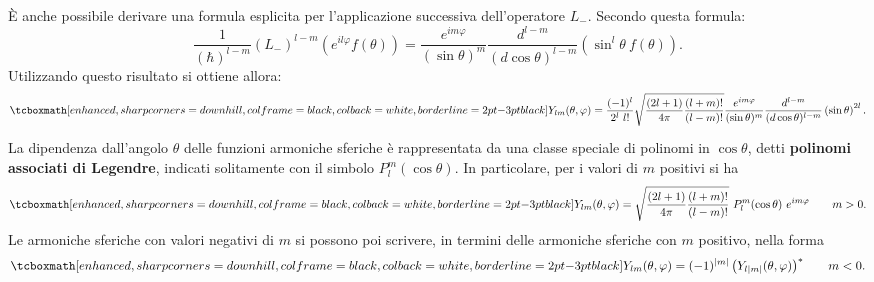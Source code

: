 È anche possibile derivare una formula esplicita per l'applicazione successiva dell'operatore $L_-$. Secondo questa formula:
	\begin{equation}
		\frac{1}{(\hbar) ^{l-m}}(L_-)^{l-m} \left( e^{il\varphi} f(\theta) \right) = \frac{e^{im\varphi}}{(\sin \theta ) ^m} \frac{d^{l-m}}{(d\cos \theta )^{l-m}}\left( \sin ^l \theta \ f(\theta ) \right).
	\end{equation}
Utilizzando questo risultato si ottiene allora:
	\begin{align}
		\tcboxmath[enhanced, sharp corners=downhill, colframe=black, colback=white, borderline={2pt}{-3pt}{black}]{
			Y_{lm} (\theta ,  \varphi ) = \frac{(-1)^{l}}{2^l\ l!}\sqrt{\frac{(2l+1)}{4\pi}\frac{(l+m)!}{(l-m)!}}  \frac{e^{im\varphi}}{(\sin \theta ) ^m} \frac{d^{l-m}}{(d\cos \theta )^{l-m}}\left( \sin  \theta \right) ^{2l}.
			}\nonumber \\[0.1cm] 
	\end{align}
La dipendenza dall'angolo $\theta$ delle funzioni armoniche sferiche è rappresentata da una classe speciale di polinomi in $\cos \theta$, detti \textbf{polinomi associati di Legendre}, indicati solitamente con il simbolo $P_l ^m (\cos \theta)$. In particolare, per i valori di $m$ positivi si ha 
	\begin{equation}
		\tcboxmath[enhanced, sharp corners=downhill, colframe=black, colback=white, borderline={2pt}{-3pt}{black}]{
			Y_{lm} (\theta ,  \varphi ) = \sqrt{\frac{(2l+1)}{4\pi}\frac{(l+m)!}{(l-m)!}}\ P_l ^m (\cos \theta)\ e^{im\varphi}
			}\qquad m>0.
	\end{equation}
Le armoniche sferiche con valori negativi di $m$ si possono poi scrivere, in termini delle armoniche sferiche con $m$ positivo, nella forma
	\begin{equation}
		\tcboxmath[enhanced, sharp corners=downhill, colframe=black, colback=white, borderline={2pt}{-3pt}{black}]{
			Y_{lm} (\theta ,  \varphi ) = (-1)^{|m|}\left(Y_{l|m|} (\theta ,  \varphi )\right) ^*
			} \qquad m<0.
\end{equation}
